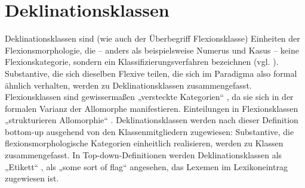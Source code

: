 \chapter{Deklinationsklassen}
\label{chap:3}
Deklinationsklassen sind (wie auch der Überbegriff Flexionsklasse) Einheiten der Flexionsmorphologie, die -- anders als beispielsweise Numerus und Kasus -- keine Flexionskategorie, sondern ein Klassifizierungsverfahren bezeichnen (vgl. \citealt[21]{Kürschner2008a}). Substantive, die sich dieselben Flexive teilen, die sich im Paradigma also formal ähnlich verhalten, werden zu Deklinationsklassen zusammengefasst. Flexionsklassen sind gewissermaßen „versteckte Kategorien“ \citep[28]{Dammel2011}, da sie sich in der formalen Varianz der Allomorphe manifestieren. Einteilungen in Flexionsklassen „strukturieren Allomorphie“ \citep[20]{Dammel2011}. Deklinationsklassen werden nach dieser Definition bottom-up ausgehend von den Klassenmitgliedern zugewiesen: Substantive, die flexionsmorphologische Kategorien einheitlich realisieren, werden zu Klassen zusammengefasst. In Top-down-Definitionen werden Deklinationsklassen als „Etikett“ \citep[23]{Dammel2011}, als „some sort of flag“ \citep[65]{Aronoff1994} angesehen, das Lexemen im Lexikoneintrag zugewiesen ist.

